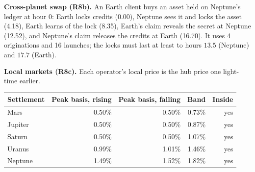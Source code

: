 

\textbf{Cross-planet swap (R8b).} An Earth client buys an asset held on Neptune's ledger at hour 0: Earth locks credits (0.00), Neptune sees it and locks the asset (4.18), Earth learns of the lock (8.35), Earth's claim reveals the secret at Neptune (12.52), and Neptune's claim releases the credits at Earth (16.70). It uses 4 originations and 16 launches; the locks must last at least to hours $13.5$ (Neptune) and $17.7$ (Earth).

\textbf{Local markets (R8c).} Each operator's local price is the hub price one light-time earlier.
\begin{table}[H]
\centering
\small
\begin{tabular}{@{}lrrrr@{}}
\toprule
Settlement & Peak basis, rising & Peak basis, falling & Band & Inside \\
\midrule
Mars & 0.50\% & 0.50\% & 0.73\% & yes \\
Jupiter & 0.50\% & 0.50\% & 0.87\% & yes \\
Saturn & 0.50\% & 0.50\% & 1.07\% & yes \\
Uranus & 0.99\% & 1.01\% & 1.46\% & yes \\
Neptune & 1.49\% & 1.52\% & 1.82\% & yes \\
\bottomrule
\end{tabular}
\end{table}

